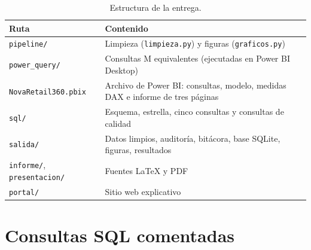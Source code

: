 \documentclass[11pt,letterpaper]{article}
\begin{document}
\begin{table}[H]
\centering
\caption{Estructura de la entrega.}
\begin{tabularx}{\linewidth}{l L}
\toprule
Ruta & Contenido \\
\midrule
\texttt{pipeline/} & Limpieza (\texttt{limpieza.py}) y figuras (\texttt{graficos.py}) \\
\texttt{power\_query/} & Consultas M equivalentes (ejecutadas en Power BI Desktop) \\
\texttt{NovaRetail360.pbix} & Archivo de Power BI: consultas, modelo, medidas DAX e informe de tres páginas \\
\texttt{sql/} & Esquema, estrella, cinco consultas y consultas de calidad \\
\texttt{salida/} & Datos limpios, auditoría, bitácora, base SQLite, figuras, resultados \\
\texttt{informe/}, \texttt{presentacion/} & Fuentes LaTeX y PDF \\
\texttt{portal/} & Sitio web explicativo \\
\bottomrule
\end{tabularx}
\end{table}

\appendix
\section{Consultas SQL comentadas}


\end{document}
